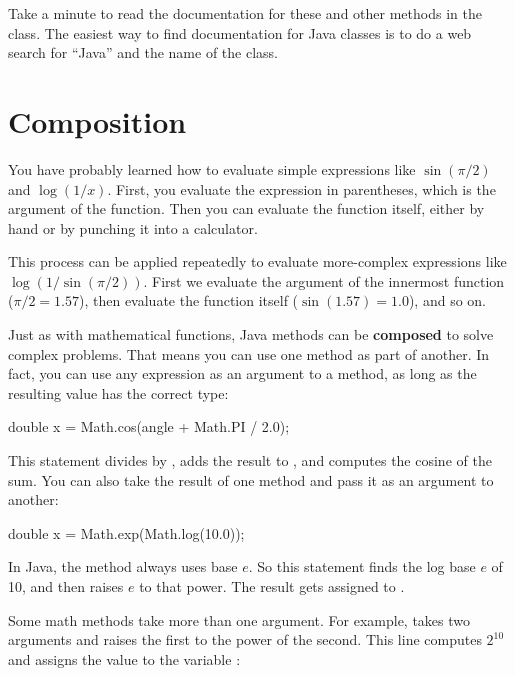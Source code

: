 Take a minute to read the documentation for these and other methods in the  class.
The easiest way to find documentation for Java classes is to do a web search for ``Java'' and the name of the class.


\section{Composition}


You have probably learned how to evaluate simple expressions like $\sin(\pi/2)$ and $\log(1/x)$.
First, you evaluate the expression in parentheses, which is the argument of the function.
Then you can evaluate the function itself, either by hand or by punching it into a calculator.

This process can be applied repeatedly to evaluate more-complex expressions like $\log(1/\sin(\pi/2))$.
First we evaluate the argument of the innermost function ($\pi/2 = 1.57$), then evaluate the function itself ($\sin(1.57) = 1.0$), and so on.


Just as with mathematical functions, Java methods can be {\bf composed} to solve complex problems.
That means you can use one method as part of another.
In fact, you can use any expression as an argument to a method, as long as the resulting value has the correct type:

\begin{code}
double x = Math.cos(angle + Math.PI / 2.0);
\end{code}

This statement divides  by , adds the result to , and computes the cosine of the sum.
You can also take the result of one method and pass it as an argument to another:

\begin{code}
double x = Math.exp(Math.log(10.0));
\end{code}

In Java, the  method always uses base $e$.
So this statement finds the log base $e$ of 10, and then raises $e$ to that power.
The result gets assigned to .

Some math methods take more than one argument.
For example,  takes two arguments and raises the first to the power of the second.
This line computes $2^{10}$ and assigns the value  to the variable :


